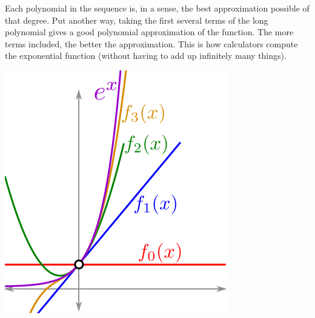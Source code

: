 \documentclass[twoside,openright,titlepage,a4paper]{book}
\begin{document}
\begin{sloppypar}
Each polynomial in the sequence is, in a sense, the best approximation possible of that degree. Put another way, taking the first several terms of the long polynomial gives a good polynomial approximation of the function. The more terms included, the better the approximation. This is how calculators compute the exponential function (without having to add up infinitely many things).
\begin{center}
	\includegraphics[scale=0.6]{ExponentialApproximants}
\end{center}
\noindent\makebox[\linewidth]{\rule{\paperwidth}{0.4pt}}


\end{sloppypar}
\end{document}
